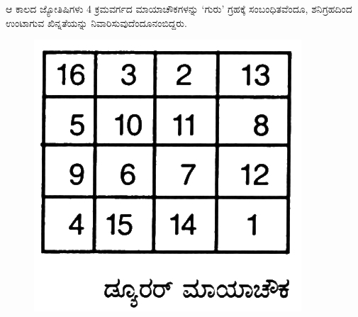 ಆ ಕಾಲದ ಜ್ಯೋತಿಷಿಗಳು 4 ಕ್ರಮವರ್ಗದ ಮಾಯಾಚೌಕಗಳನ್ನು ‘ಗುರು’ ಗ್ರಹಕ್ಕೆ \break ಸಂಬಂಧಿತವೆಂದೂ, ಶನಿಗ್ರಹದಿಂದ ಉಂಟಾಗುವ ಖಿನ್ನತೆಯನ್ನು ನಿವಾರಿಸುವುದೆಂದೂ\break ನಂಬಿದ್ದರು.
\begin{figure}[H]
\includegraphics[scale=.75]{src/figures/chap4/fig4.15.jpg}
\end{figure}
